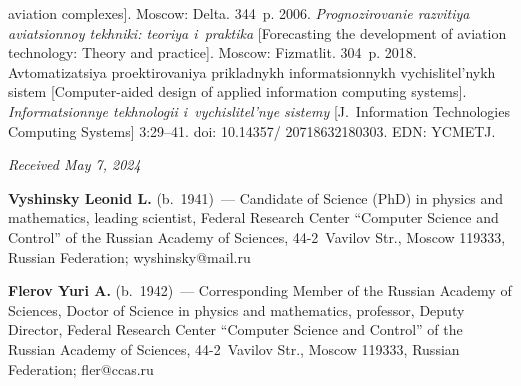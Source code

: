 \begin{multicols}{2}
{{\begin{thebibliography}{99}
aviation complexes]. Moscow: Delta. 344~p.
       2006. \textit{Prognozirovanie razvitiya avia\-tsi\-on\-noy tekhniki: 
teoriya i~praktika} [Forecasting the development of aviation technology: Theory and practice]. 
Moscow: Fizmatlit. 304~p.
       2018. Av\-to\-ma\-tizatsiya proektirovaniya 
prikladnykh informatsionnykh vy\-chis\-li\-tel'\-nykh sis\-tem [Computer-aided design of applied 
information computing systems]. \textit{Informatsionnye tekhnologii i~vychislitel'nye sis\-te\-my} 
[J.~Information Technologies Computing Systems] 3:29--41. doi: 10.14357/ 20718632180303. 
EDN: YCMETJ.
     


\end{thebibliography}

 }
 }

\end{multicols}

\vspace*{-6pt}

\hfill{\small\textit{Received May 7, 2024}} 

\vspace*{-18pt}

\Contr

\vspace*{-3pt}


      \noindent
      \textbf{Vyshinsky Leonid L.} (b.\ 1941)~--- Candidate of Science (PhD) in physics and 
mathematics, leading scientist, Federal Research Center ``Computer Science and Control'' of the 
Russian Academy of Sciences, 44-2~Vavilov Str., Moscow 119333, Russian Federation; 
\mbox{wyshinsky@mail.ru} 
      
      \vspace*{3pt}
      
      \noindent
      \textbf{Flerov Yuri A.} (b.\ 1942)~--- Corresponding Member of the Russian Academy of 
Sciences, Doctor of Science in physics and mathematics, professor, Deputy Director, Federal 
Research Center ``Computer Science and Control'' of the Russian Academy of Sciences,  
44-2~Vavilov Str., Moscow 119333, Russian Federation; \mbox{fler@ccas.ru}
    

\label{end\stat}

\renewcommand{\bibname}{\protect\rm Литература} 
      